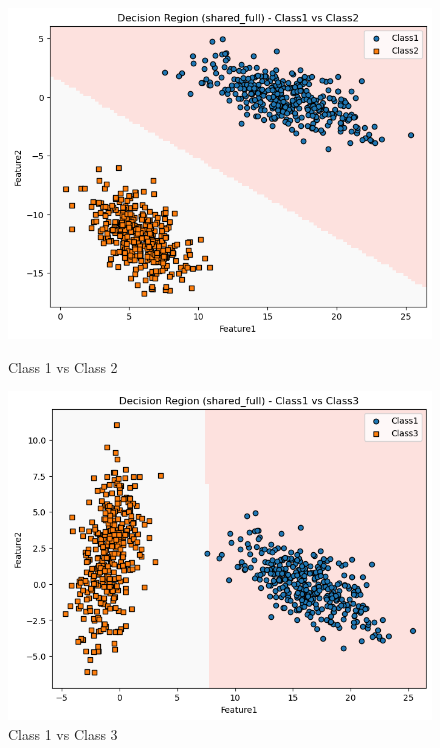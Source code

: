 \begin{figure}[H]
    \centering
    \begin{minipage}{0.32\linewidth}
        \includegraphics[width=\linewidth]{images/LS_Group04_images/02_shared_full/02_decision_region_c1_c2.png}
        \caption*{Class 1 vs Class 2}
    \end{minipage}
    \hfill
    \begin{minipage}{0.32\linewidth}
        \includegraphics[width=\linewidth]{images/LS_Group04_images/02_shared_full/03_decision_region_c1_c3.png}
        \caption*{Class 1 vs Class 3}
    \end{minipage}
    \hfill
    \begin{minipage}{0.32\linewidth}

\end{minipage}
\end{figure}
